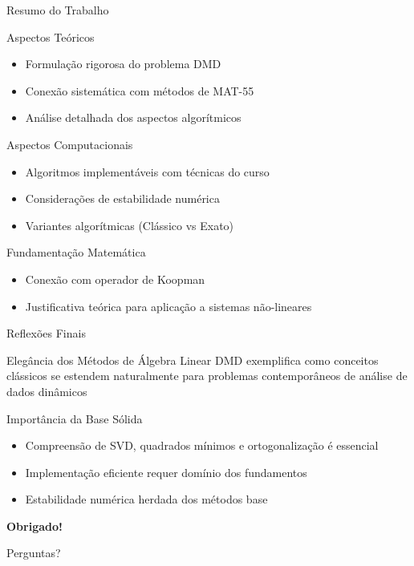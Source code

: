 \documentclass[aspectratio=169]{beamer}
\begin{document}
\begin{frame}{Resumo do Trabalho}
    \begin{block}{Aspectos Teóricos}
        \begin{itemize}
            \item Formulação rigorosa do problema DMD
            \item Conexão sistemática com métodos de MAT-55
            \item Análise detalhada dos aspectos algorítmicos
        \end{itemize}
    \end{block}
    
    \begin{block}{Aspectos Computacionais}
        \begin{itemize}
            \item Algoritmos implementáveis com técnicas do curso
            \item Considerações de estabilidade numérica
            \item Variantes algorítmicas (Clássico vs Exato)
        \end{itemize}
    \end{block}
    
    \begin{block}{Fundamentação Matemática}
        \begin{itemize}
            \item Conexão com operador de Koopman
            \item Justificativa teórica para aplicação a sistemas não-lineares
        \end{itemize}
    \end{block}
\end{frame}

\begin{frame}{Reflexões Finais}
    \begin{alertblock}{Elegância dos Métodos de Álgebra Linear}
        DMD exemplifica como conceitos clássicos se estendem naturalmente para problemas contemporâneos de análise de dados dinâmicos
    \end{alertblock}
    
    \begin{block}{Importância da Base Sólida}
        \begin{itemize}
            \item Compreensão de SVD, quadrados mínimos e ortogonalização é essencial
            \item Implementação eficiente requer domínio dos fundamentos
            \item Estabilidade numérica herdada dos métodos base
        \end{itemize}
    \end{block}
    
    \begin{center}
        \Large \textbf{Obrigado!}
        
        \vspace{0.5cm}
        Perguntas?
    \end{center}
\end{frame}
\end{document}
